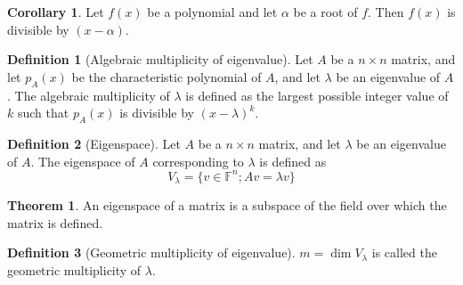 \documentclass[fleqn, a4paper, 12pt]{article}
\theoremstyle{definition}
\newtheorem{definition}{Definition} %
\theoremstyle{theorem}
\newtheorem{theorem}{Theorem} %
\newtheorem{corollary}{Corollary}
\theoremstyle{remark}
\numberwithin{corollary}{theorem}
\numberwithin{equation}{theorem}
\begin{document}
\begin{corollary}
	Let $f(x)$ be a polynomial and let $\alpha$ be a root of $f$. Then $f(x)$ is divisible by $(x - \alpha)$.
\end{corollary}

\begin{definition}[Algebraic multiplicity of eigenvalue]
	Let $A$ be a $n \times n$ matrix, and let $p_A (x)$ be the characteristic polynomial of $A$, and let $\lambda$ be an eigenvalue of $A$. The algebraic multiplicity of $\lambda$ is defined as the largest possible integer value of $k$ such that $p_A(x)$ is divisible by $(x - \lambda)^k$.
\end{definition}

\begin{definition}[Eigenspace]
	Let $A$ be a $n \times n$ matrix, and let $\lambda$ be an eigenvalue of $A$. The eigenspace of $A$ corresponding to $\lambda$ is defined as
	\begin{equation*}
		V_{\lambda} = \{v \in \mathbb{F}^n ; A v = \lambda v \}
	\end{equation*} 
\end{definition}

\begin{theorem}
	An eigenspace of a matrix is a subspace of the field over which the matrix is defined.
\end{theorem}

\begin{definition}[Geometric multiplicity of eigenvalue]
	$m = \dim V_{\lambda}$ is called the geometric multiplicity of $\lambda$.
\end{definition}
\end{document}
